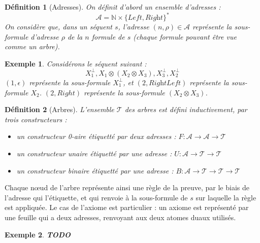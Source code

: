 \documentclass[11pt,a4paper]{article}
\newtheorem{example}{Exemple}
\newtheorem{definition}{Définition}
\newcommand*{\orth}{^\perp}
\newcommand*{\tensor}{\otimes}
\newcommand*{\Left}{\textit{Left}}
\newcommand*{\Right}{\textit{Right}}
\newcommand*{\trees}{\ensuremath{\mathcal{T}}}
\newcommand*{\todo}{{\normalfont \textbf{TODO}} }
\begin{document}
\begin{definition}[Adresses]
On définit d'abord un ensemble d'adresses :
\begin{equation*}
\mathcal{A} = \mathbb{N} \times \{ \Left, \Right\}^{*}  
\end{equation*}
On considère que, dans un séquent $s$, l'adresse $(n, \rho) \in \mathcal{A}$ représente la sous-formule d'adresse $\rho$ de la $n$\ieme{} formule de $s$ (chaque formule pouvant être vue comme un arbre).
\end{definition}

\begin{example}
Considérons le séquent suivant : 
\begin{equation*}
X_1\orth, X_1 \tensor (X_2 \tensor X_3), X_3\orth, X_2\orth
\end{equation*}
$(1, \epsilon)$ représente la sous-formule $X_1\orth$, et $(2, \Right \Left)$ représente la sous-formule $X_2$. $(2, Right)$ représente la sous-formule $(X_2 \tensor X_3)$.
\end{example}

\begin{definition}[Arbres]
L'ensemble \trees{} des arbres est défini inductivement, par trois constructeurs :
\begin{itemize}
  \item un constructeur 0-aire étiquetté par deux adresses : $F: \mathcal{A} \rightarrow \mathcal{A} \rightarrow \trees$
  \item un constructeur unaire étiquetté par une adresse : $U: \mathcal{A} \rightarrow \trees \rightarrow \trees$
  \item un constructeur binaire étiquetté par une adresse : $B: \mathcal{A} \rightarrow \trees \rightarrow \trees \rightarrow \trees$
\end{itemize}
\end{definition}

Chaque n\oe ud de l'arbre représente ainsi une règle de la preuve, par le biais de l'adresse qui l'étiquette, et qui renvoie à la sous-formule de $s$ sur laquelle la règle est appliquée. Le cas de l'axiome est particulier : un axiome est représenté par une feuille qui a deux adresses, renvoyant aux deux atomes duaux utilisés.

\begin{example}
  \todo
\end{example}
\end{document}
